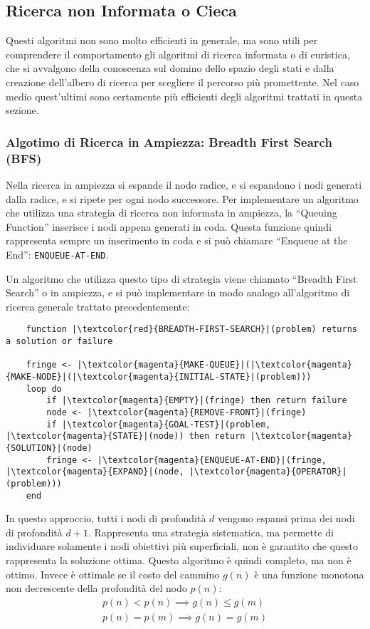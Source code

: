 \documentclass{article}
\numberwithin{equation}{subsection}
\begin{document}
\subsection{Ricerca non Informata o Cieca}
Questi algoritmi non sono molto efficienti in generale, ma sono utili per comprendere il 
comportamento gli algoritmi di ricerca informata o di euristica, che si avvalgono della 
conoscenza sul domino dello spazio degli stati e dalla creazione dell'albero di 
ricerca per scegliere il percorso più promettente. Nel caso medio quest'ultimi sono certamente 
più efficienti degli algoritmi trattati in questa sezione. 

\subsubsection{Algotimo di Ricerca in Ampiezza: Breadth First Search (BFS)}

Nella ricerca in ampiezza si espande il nodo radice, e si espandono i nodi generati dalla 
radice, e si ripete per ogni nodo successore. Per implementare un algoritmo che utilizza una 
strategia di ricerca non informata in ampiezza, la ``Queuing Function'' inserisce i nodi 
appena generati in coda. Questa funzione quindi rappresenta sempre un inserimento in coda 
e si può chiamare ``Enqueue at the End'': \color{magenta}\verb|ENQUEUE-AT-END|\color{black}. 

Un algoritmo che utilizza questo tipo di strategia viene chiamato ``Breadth First Search'' o 
in ampiezza, e si può implementare in modo analogo all'algoritmo di ricerca generale trattato 
precedentemente:
\begin{verbatim}
    function |\textcolor{red}{BREADTH-FIRST-SEARCH}|(problem) returns a solution or failure
    
    fringe <- |\textcolor{magenta}{MAKE-QUEUE}|(|\textcolor{magenta}{MAKE-NODE}|(|\textcolor{magenta}{INITIAL-STATE}|(problem)))
    loop do
        if |\textcolor{magenta}{EMPTY}|(fringe) then return failure
        node <- |\textcolor{magenta}{REMOVE-FRONT}|(fringe)
        if |\textcolor{magenta}{GOAL-TEST}|(problem, |\textcolor{magenta}{STATE}|(node)) then return |\textcolor{magenta}{SOLUTION}|(node)
        fringe <- |\textcolor{magenta}{ENQUEUE-AT-END}|(fringe, |\textcolor{magenta}{EXPAND}|(node, |\textcolor{magenta}{OPERATOR}|(problem)))
    end
\end{verbatim}

In questo approccio, tutti i nodi di profondità $d$ vengono espansi prima dei nodi di profondità 
$d+1$. Rappresenta una strategia sistematica, ma permette di individuare solamente i nodi 
obiettivi più superficiali, non è garantito che questo rappresenta la soluzione ottima. Questo 
algoritmo è quindi completo, ma non è ottimo. 
Invece è ottimale se il costo del cammino $g(n)$ è una funzione monotona non decrescente della 
profondità del nodo $p(n)$:
\begin{gather*}
    p(n)<p(n)\implies g(n)\leq g(m)\\
    p(n)=p(m)\implies g(n)=g(m)
\end{gather*} 
\end{document}
